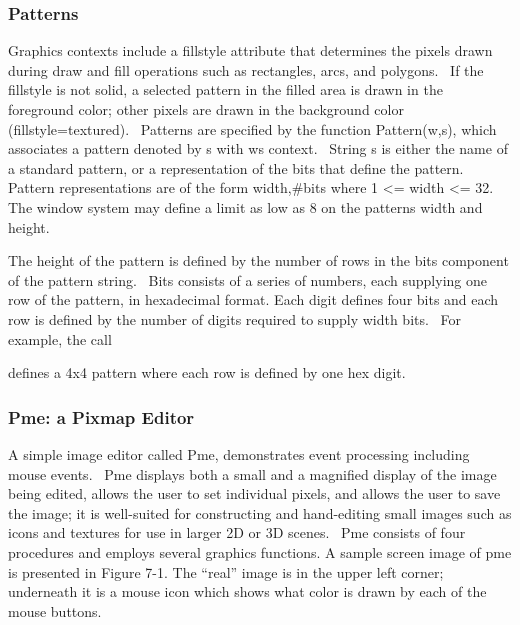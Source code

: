 \subsubsection{Patterns}

Graphics contexts include a fillstyle attribute that determines the
pixels drawn during draw and fill operations such as rectangles, arcs,
and polygons. \ If the fillstyle is not solid, a selected pattern in
the filled area is drawn in the foreground color; other pixels are
drawn in the background color
({\textquotedbl}fillstyle=textured{\textquotedbl}). \ Patterns are
specified by the function Pattern(w,s), which associates a pattern
denoted by s with w{\textquotesingle}s context. \ String s is either
the name of a standard pattern, or a representation of the bits that
define the pattern. Pattern representations are of the form
{\textquotedbl}width,\#bits{\textquotedbl} where 1 {\textless}= width
{\textless}= 32. The window system may define a limit as low as 8 on
the pattern{\textquotesingle}s width and height.

The height of the pattern is defined by the number of rows in the bits
component of the pattern string. \ Bits consists of a series of
numbers, each supplying one row of the pattern, in hexadecimal format.
Each digit defines four bits and each row is defined by the number of
digits required to supply width bits. \ For example, the call


\noindent defines a 4x4 pattern where each row is defined by one hex digit.

\subsubsection{Pme: a Pixmap Editor}

A simple image editor called Pme, demonstrates event processing
including mouse events. \ Pme displays both a small and a
{\textquotedbl}magnified{\textquotedbl} display of the image being
edited, allows the user to set individual pixels, and allows the user
to save the image; it is well-suited for constructing and hand-editing
small images such as icons and textures for use in larger 2D or 3D
scenes. \ Pme consists of four procedures and employs several graphics
functions. A sample screen image of pme is presented in Figure 7-1. The
{\textquotedblleft}real{\textquotedblright} image is in the upper left
corner; underneath it is a mouse icon which shows what color is drawn
by each of the mouse buttons.



